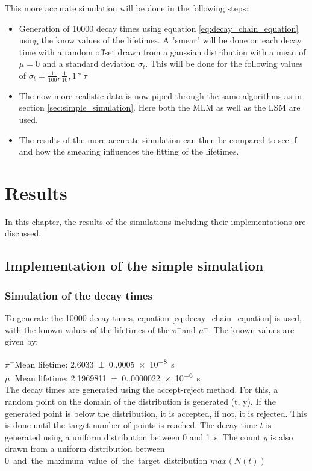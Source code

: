 \documentclass[11pt, a4paper, oneside]{book}
\newcommand{\pion}{$\pi^{-}$}
\newcommand{\muon}{$\mu^{-}$}
\begin{document}
This more accurate simulation will be done in the following steps:
\begin{itemize}
  \item Generation of \num{10000} decay times using equation \ref{eq:decay_chain_equation} using the know values of the lifetimes. A "smear" will be done on each decay time with a random offset drawn from a gaussian distribution with a mean of $\mu = 0$ and a standard deviation $\sigma_t$. This will be done for the following values of $\sigma_t = \frac{1}{100}, \frac{1}{10}, 1 * \tau$
  \item The now more realistic data is now piped through the same algorithms as in section \ref{sec:simple_simulation}. Here both the MLM as well as the LSM are used.
  \item The results of the more accurate simulation can then be compared to see if and how the smearing influences the fitting of the lifetimes.
\end{itemize}


\chapter{Results}

In this chapter, the results of the simulations including their implementations are discussed.

\section{Implementation of the simple simulation}

\subsection{Simulation of the decay times}
To generate the \num{10000} decay times, equation \ref{eq:decay_chain_equation} is used, with the known values of the lifetimes of the \pion and \muon. The known values are given by: \cite{ParticleDataGroup:2024cfk}

\pion Mean lifetime: \qty{2.6033(0.0005)e-8}{\s} \\
\muon Mean lifetime: \qty{2.1969811(0.0000022)e-6}{\s} \\

The decay times are generated using the accept-reject method. For this, a random point on the domain of the distribution is generated (t, y). If the generated point is below the distribution, it is accepted, if not, it is rejected. This is done until the target number of points is reached. 
The decay time $t$ is generated using a uniform distribution between 0 and \qty{1}{\s}. The count $y$ is also drawn from a uniform distribution between \qty{0} and the maximum value of the target distribution $max(N(t))$
\end{document}
